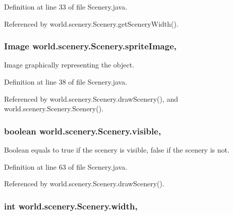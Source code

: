 Definition at line 33 of file Scenery.\-java.



Referenced by world.\-scenery.\-Scenery.\-get\-Scenery\-Width().

\hypertarget{classworld_1_1scenery_1_1_scenery_a512d9c0a154e6843389e343d80843326}{
\subsubsection[{sprite\-Image}]{\setlength{\rightskip}{0pt plus 5cm}Image world.\-scenery.\-Scenery.\-sprite\-Image\hspace{0.3cm}{\ttfamily [protected]}, {\ttfamily [inherited]}}}\label{classworld_1_1scenery_1_1_scenery_a512d9c0a154e6843389e343d80843326}


Image graphically representing the object. 



Definition at line 38 of file Scenery.\-java.



Referenced by world.\-scenery.\-Scenery.\-draw\-Scenery(), and world.\-scenery.\-Scenery.\-Scenery().

\hypertarget{classworld_1_1scenery_1_1_scenery_a7b22a78d3126c947b7010fdbbea02218}{
\subsubsection[{visible}]{\setlength{\rightskip}{0pt plus 5cm}boolean world.\-scenery.\-Scenery.\-visible\hspace{0.3cm}{\ttfamily [protected]}, {\ttfamily [inherited]}}}\label{classworld_1_1scenery_1_1_scenery_a7b22a78d3126c947b7010fdbbea02218}


Boolean equals to true if the scenery is visible, false if the scenery is not. 



Definition at line 63 of file Scenery.\-java.



Referenced by world.\-scenery.\-Scenery.\-draw\-Scenery().

\hypertarget{classworld_1_1scenery_1_1_scenery_ad10b27080954e2fc06aa1718f47c4ce1}{
\subsubsection[{width}]{\setlength{\rightskip}{0pt plus 5cm}int world.\-scenery.\-Scenery.\-width\hspace{0.3cm}{\ttfamily [protected]}, {\ttfamily [inherited]}}}\label{classworld_1_1scenery_1_1_scenery_ad10b27080954e2fc06aa1718f47c4ce1}


